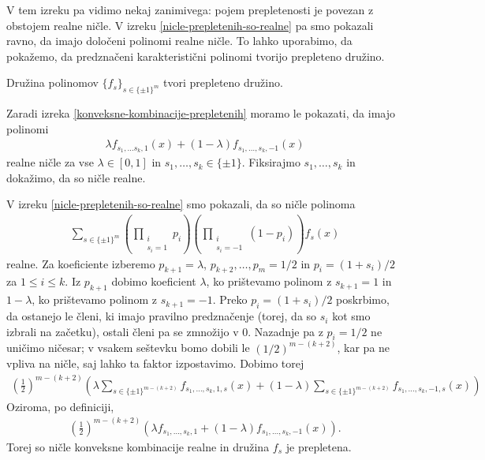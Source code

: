 V tem izreku pa vidimo nekaj zanimivega: pojem prepletenosti je povezan z obstojem realne ničle. V izreku \ref{nicle-prepletenih-so-realne} pa smo pokazali ravno, da imajo določeni polinomi realne ničle. To lahko uporabimo, da pokažemo, da predznačeni karakteristični polinomi tvorijo prepleteno družino.

\begin{izrek}\label{karakteristicni-so-prepleteni}
    Družina polinomov \(\{f_s\}_{s\in \{\pm 1\}^m}\) tvori prepleteno družino.
\end{izrek}
\begin{dokaz}
    Zaradi izreka \ref{konveksne-kombinacije-prepletenih} moramo le pokazati, da imajo polinomi
    \begin{align*}
        \lambda f_{s_1, \ldots s_k, 1}(x) + (1-\lambda)f_{s_1,\ldots, s_k, -1}(x)
    \end{align*}
    realne ničle za vse \(\lambda\in [0,1]\) in \(s_1, \ldots, s_k\in \{\pm 1\}\). Fiksirajmo \(s_1, \ldots, s_k\) in dokažimo, da so ničle realne.

    V izreku \ref{nicle-prepletenih-so-realne} smo pokazali, da so ničle polinoma
    \begin{align*}
        \sum_{s\in \{\pm 1\}^m} \left(\prod_{\substack{i \\s_i=1}} p_{i}\right) \left(\prod_{\substack{i\\s_i=-1}} (1- p_{i})\right) f_s(x)
    \end{align*}
    realne. Za koeficiente izberemo \(p_{k+1}=\lambda\), \(p_{k+2},\ldots, p_m=1/2\) in \(p_i = (1+s_i)/2\) za \(1\leq i\leq k\). Iz \(p_{k+1}\) dobimo koeficient \(\lambda\), ko prištevamo polinom z \(s_{k+1}=1\) in \(1-\lambda\), ko prištevamo polinom z \(s_{k+1} = -1\). Preko \(p_i = (1+s_i)/2\) poskrbimo, da ostanejo le členi, ki imajo pravilno predznačenje (torej, da so \(s_i\) kot smo izbrali na začetku), ostali členi pa se zmnožijo v \(0\). Nazadnje pa z \(p_i = 1/2\) ne uničimo ničesar; v vsakem seštevku bomo dobili le \((1/2)^{m-(k+2)}\), kar pa ne vpliva na ničle, saj lahko ta faktor izpostavimo. Dobimo torej 
    \begin{align*}
        \left(\frac12\right)^{m-(k+2)}\left(\lambda \sum_{s\in \{\pm 1\}^{m-(k+2)}}f_{s_1, \ldots, s_k, 1, s}(x) +(1-\lambda) \sum_{s\in \{\pm 1\}^{m-(k+2)}}f_{s_1, \ldots, s_k, -1, s}(x)\right)
    \end{align*}
    Oziroma, po definiciji,
    \begin{align*}
        \left(\frac12\right)^{m-(k+2)}(\lambda f_{s_1, \ldots, s_k, 1} + (1-\lambda)f_{s_1,\ldots, s_k, -1}(x)).
    \end{align*}
    Torej so ničle konveksne kombinacije realne in družina \(f_s\) je prepletena.
\end{dokaz}

